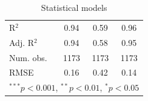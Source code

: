 \documentclass{beamer}
\newcommand{\1}{\mathbb{1}}
\begin{document}
\begin{frame}
\begin{table}
\begin{center}
\begin{tabular}{l c c c }
\hline
R$^2$                     & 0.94          & 0.59          & 0.96          \\
Adj. R$^2$                & 0.94          & 0.58          & 0.95          \\
Num. obs.                 & 1173          & 1173          & 1173          \\
RMSE                      & 0.16          & 0.42          & 0.14          \\
\hline
\multicolumn{4}{l}{\scriptsize{$^{***}p<0.001$, $^{**}p<0.01$, $^*p<0.05$}}
\end{tabular}
\caption{Statistical models}
\label{table:coefficients}
\end{center}
\end{table}
\end{frame}

\begin{frame}\frametitle{}
\end{frame}
\end{document}
